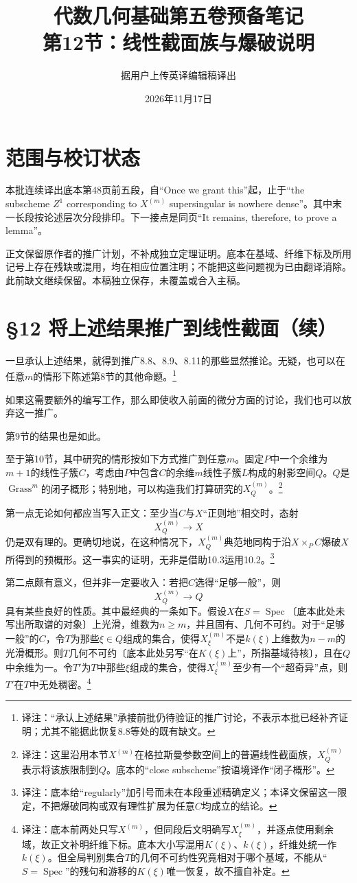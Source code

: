 \documentclass[openany,fontset=fandol]{ctexbook}
\newcommand{\note}[1]{\footnote{译注：#1}}
\begin{document}
\title{代数几何基础第五卷预备笔记\\第12节：线性截面族与爆破说明}
\author{据用户上传英译编辑稿译出}
\date{2026年11月17日}
\maketitle
\chapter*{范围与校订状态}
本批连续译出底本第48页前五段，自“Once we grant this”起，止于“the subscheme $Z^1$ corresponding to $X^{(m)}$ supersingular is nowhere dense”。其中末一长段按论述层次分段排印。下一接点是同页“It remains, therefore, to prove a lemma”。

正文保留原作者的推广计划，不补成独立定理证明。底本在基域、纤维下标及所用记号上存在残缺或混用，均在相应位置注明；不能把这些问题视为已由翻译消除。此前缺文继续保留。本稿独立保存，未覆盖或合入主稿。
\chapter*{§12 将上述结果推广到线性截面（续）}
一旦承认上述结果，就得到推广8.8、8.9、8.11的那些显然推论。无疑，也可以在任意$m$的情形下陈述第8节的其他命题。\note{“承认上述结果”承接前批仍待验证的推广讨论，不表示本批已经补齐证明；尤其不能据此恢复8.8等处的既有缺文。}

如果这需要额外的编写工作，那么即使收入前面的微分方面的讨论，我们也可以放弃这一推广。

第9节的结果也是如此。

至于第10节，其中研究的情形按如下方式推广到任意$m$。固定$P$中一个余维为$m+1$的线性子簇$C$，考虑由$P$中包含$C$的余维$m$线性子簇$L$构成的射影空间$Q$。$Q$是$\operatorname{Grass}^m$的闭子概形；特别地，可以构造我们打算研究的$X_Q^{(m)}$。\note{这里沿用本节$X^{(m)}$在格拉斯曼参数空间上的普遍线性截面族，$X_Q^{(m)}$表示将该族限制到$Q$。底本的“close subscheme”按语境译作“闭子概形”。}

\newpage
第一点无论如何都应当写入正文：至少当$C$与$X$“正则地”相交时，态射
\[
X_Q^{(m)}\longrightarrow X
\]
仍是双有理的。更确切地说，在这种情况下，$X_Q^{(m)}$典范地同构于沿$X\times_P C$爆破$X$所得到的预概形。这一事实的证明，无非是借助10.3运用10.2。\note{底本给“regularly”加引号而未在本段重述精确定义；本译文保留这一限定，不把爆破同构或双有理性扩展为任意$C$均成立的结论。}

第二点颇有意义，但并非一定要收入：若把$C$选得“足够一般”，则
\[
X_Q^{(m)}\longrightarrow Q
\]
具有某些良好的性质。其中最经典的一条如下。假设$X$在$S=\operatorname{Spec}$〔底本此处未写出所取谱的对象〕上光滑，维数为$n\geq m$，并且固有、几何不可约。对于“足够一般”的$C$，令$T$为那些$\xi\in Q$组成的集合，使得$X_\xi^{(m)}$不是$k(\xi)$上维数为$n-m$的光滑概形。则$T$几何不可约〔底本此处另写“在$K(\xi)$上”，所指基域待核〕，且在$Q$中余维为一。令$T'$为$T$中那些$\xi$组成的集合，使得$X_\xi^{(m)}$至少有一个“超奇异”点，则$T'$在$T$中无处稠密。\note{底本前两处只写$X^{(m)}$，但同段后文明确写$X_\xi^{(m)}$，并逐点使用剩余域，故正文补明纤维下标。底本大小写混用$K(\xi)$、$k(\xi)$，纤维处统一作$k(\xi)$。但全局判别集合$T$的几何不可约性究竟相对于哪个基域，不能从“$S=\operatorname{Spec}$”的残句和游移的$K(\xi)$唯一恢复，故不擅自补定。}
\end{document}
